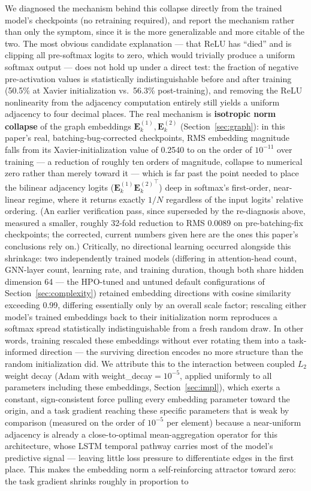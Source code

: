 \documentclass[journal]{IEEEtran}
\begin{document}
We diagnosed the mechanism behind this collapse directly from the trained model's checkpoints (no retraining required), and report the mechanism rather than only the symptom, since it is the more generalizable and more citable of the two. The most obvious candidate explanation --- that ReLU has ``died'' and is clipping all pre-softmax logits to zero, which would trivially produce a uniform softmax output --- does not hold up under a direct test: the fraction of negative pre-activation values is statistically indistinguishable before and after training (50.5\% at Xavier initialization vs.\ 56.3\% post-training), and removing the ReLU nonlinearity from the adjacency computation entirely still yields a uniform adjacency to four decimal places. The real mechanism is \textbf{isotropic norm collapse} of the graph embeddings $\mathbf{E}^{(1)}_k,\mathbf{E}^{(2)}_k$ (Section~\ref{sec:graph}): in this paper's real, batching-bug-corrected checkpoints, RMS embedding magnitude falls from its Xavier-initialization value of 0.2540 to on the order of $10^{-11}$ over training --- a reduction of roughly ten orders of magnitude, collapse to numerical zero rather than merely toward it --- which is far past the point needed to place the bilinear adjacency logits ($\mathbf{E}^{(1)}_k{\mathbf{E}^{(2)}_k}^\top$) deep in softmax's first-order, near-linear regime, where it returns exactly $1/N$ regardless of the input logits' relative ordering. (An earlier verification pass, since superseded by the re-diagnosis above, measured a smaller, roughly 32-fold reduction to RMS 0.0089 on pre-batching-fix checkpoints; the corrected, current numbers given here are the ones this paper's conclusions rely on.) Critically, no directional learning occurred alongside this shrinkage: two independently trained models (differing in attention-head count, GNN-layer count, learning rate, and training duration, though both share hidden dimension 64 --- the HPO-tuned and untuned default configurations of Section~\ref{sec:complexity}) retained embedding directions with cosine similarity exceeding 0.99, differing essentially only by an overall scale factor; rescaling either model's trained embeddings back to their initialization norm reproduces a softmax spread statistically indistinguishable from a fresh random draw. In other words, training rescaled these embeddings without ever rotating them into a task-informed direction --- the surviving direction encodes no more structure than the random initialization did. We attribute this to the interaction between coupled $L_2$ weight decay (Adam with weight\_decay$=10^{-5}$, applied uniformly to all parameters including these embeddings, Section~\ref{sec:impl}), which exerts a constant, sign-consistent force pulling every embedding parameter toward the origin, and a task gradient reaching these specific parameters that is weak by comparison (measured on the order of $10^{-5}$ per element) because a near-uniform adjacency is already a close-to-optimal mean-aggregation operator for this architecture, whose LSTM temporal pathway carries most of the model's predictive signal --- leaving little loss pressure to differentiate edges in the first place. This makes the embedding norm a self-reinforcing attractor toward zero: the task gradient shrinks roughly in proportion to 
\end{document}
